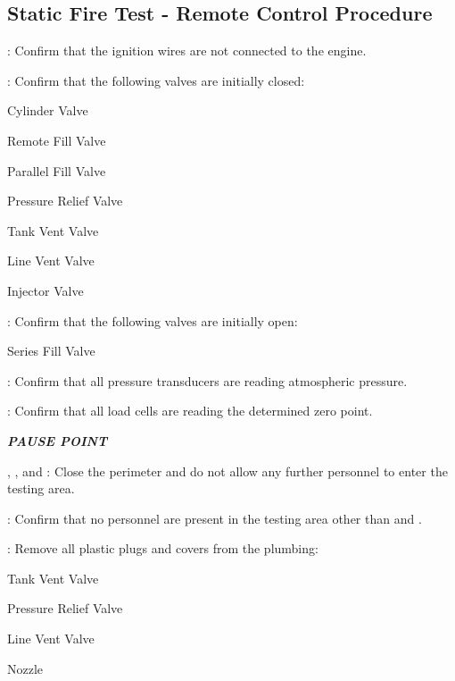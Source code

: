 \subsection{Static Fire Test - Remote Control Procedure}
\begin{checklist}
    \item \secondary: Confirm that the ignition wires are not connected to the engine.
    \item \primary{}: Confirm that the following valves are initially closed:
    \begin{checklist}
        \item Cylinder Valve
        \item Remote Fill Valve
        \item Parallel Fill Valve
        \item Pressure Relief Valve
        \item Tank Vent Valve
        \item Line Vent Valve
        \item Injector Valve
    \end{checklist}
    \item \primary{}: Confirm that the following valves are initially open:
    \begin{checklist}
        \item Series Fill Valve
    \end{checklist}
    \item \daq{}: Confirm that all pressure transducers are reading atmospheric pressure.
    \item \daq{}: Confirm that all load cells are reading the determined zero point.
    \item \textbf{\textit{PAUSE POINT}}
    \item \peri{}, \perii{}, and \periii{}: Close the perimeter and do not allow any further personnel to enter the testing area.
    \item \secondary: Confirm that no personnel are present in the testing area other than \primary{} and \secondary.
    \item \primary: Remove all plastic plugs and covers from the plumbing:
    \begin {checklist}
        \item Tank Vent Valve
        \item Pressure Relief Valve
        \item Line Vent Valve
        \item Nozzle
    \end {checklist}

\end{checklist}
